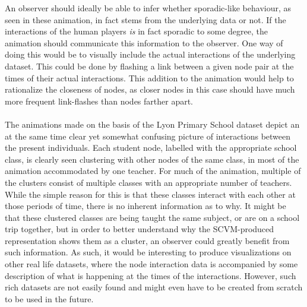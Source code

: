 An observer should ideally be able to infer whether sporadic-like behaviour, as seen in these animation, in fact stems from the underlying data or not.
If the interactions of the human players \textit{is} in fact sporadic to some degree, the animation should communicate this information to the observer.
One way of doing this would be to visually include the actual interactions of the underlying dataset.
This could be done by flashing a link between a given node pair at the times of their actual interactions.
This addition to the animation would help to rationalize the closeness of nodes, as closer nodes in this case should have much more frequent link-flashes than nodes farther apart.
\\\\
The animations made on the basis of the Lyon Primary School dataset depict an at the same time clear yet somewhat confusing picture of interactions between the present individuals.
Each student node, labelled with the appropriate school class, is clearly seen clustering with other nodes of the same class, in most of the animation accommodated by one teacher.
For much of the animation, multiple of the clusters consist of multiple classes with an appropriate number of teachers.
While the simple reason for this is that these classes interact with each other at those periods of time, there is no inherent information as to why.
It might be that these clustered classes are being taught the same subject, or are on a school trip together, but in order to better understand why the SCVM-produced representation shows them as a cluster, an observer could greatly benefit from such information.
As such, it would be interesting to produce visualizations on other real life datasets, where the node interaction data is accompanied by some description of what is happening at the times of the interactions. 
However, such rich datasets are not easily found and might even have to be created from scratch to be used in the future.








